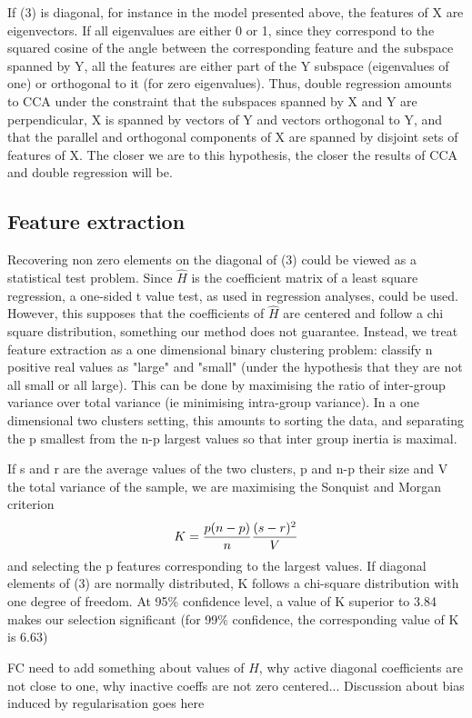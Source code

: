 \documentclass{article}
\begin{document}
If (3) is diagonal, for instance in the model presented above, the features of X are eigenvectors. If all eigenvalues are either 0 or 1, since they correspond to the squared cosine of the angle between the corresponding feature and the subspace spanned by Y, all the features are either part of the Y subspace (eigenvalues of one) or orthogonal to it (for zero eigenvalues). Thus, double regression amounts to CCA under the constraint that the subspaces spanned by X and Y are perpendicular, X is spanned by vectors of Y and vectors orthogonal to Y, and that the parallel and orthogonal components of X are spanned by disjoint sets of features of X. The closer we are to this hypothesis, the closer the results of CCA and double regression will be.

\subsection{Feature extraction}

Recovering non zero elements on the diagonal of (3) could be viewed as a statistical test problem. Since $\hat H$ is the coefficient matrix of a least square regression, a one-sided t value test, as used in regression analyses, could be used. However, this supposes that the coefficients of $\hat H$ are centered and follow a chi square distribution, something our method does not guarantee. Instead, we treat feature extraction as a one dimensional binary clustering problem: classify n positive real values as "large" and "small" (under the hypothesis that they are not all small or all large). This can be done by maximising the ratio of inter-group variance over total variance (ie minimising intra-group variance). In a one dimensional two clusters setting, this amounts to sorting the data, and separating the p smallest from the n-p largest values so that inter group inertia is maximal. 

If s and r are the average values of the two clusters, p and n-p their size and V the total variance of the sample, we are maximising the Sonquist and Morgan criterion $$K = {p (n-p) \over n} {(s-r)^2 \over V}$$ and selecting the p features corresponding to the largest values. If diagonal elements of (3) are normally distributed, K follows a chi-square distribution with one degree of freedom. At 95\% confidence level, a value of K superior to 3.84 makes our selection significant (for 99\% confidence, the corresponding value of K is 6.63) \citep{Kass_75}

FC need to add something about values of $\hat H$, why active diagonal coefficients are not close to one, why inactive coeffs are not zero centered...  
Discussion about bias induced by regularisation goes here 
\end{document}
